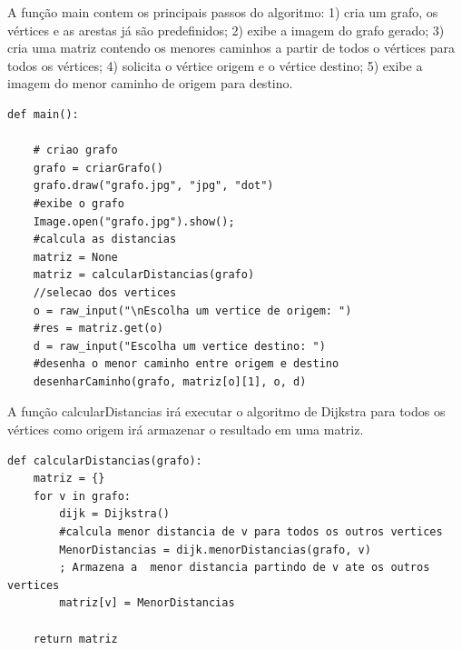 \documentclass[a4paper,12pt]{article}
\begin{document}
A função main contem os principais passos do algoritmo: 1) cria um grafo, os vértices e as arestas já são predefinidos; 2) exibe a imagem do grafo gerado; 3) cria uma matriz contendo os menores caminhos a partir de todos o vértices para todos os vértices; 4) solicita o vértice  origem e o vértice destino; 5) exibe a imagem do menor caminho de origem para destino.
\begin{lstlisting}
def main():

	# criao grafo
	grafo = criarGrafo() 
	grafo.draw("grafo.jpg", "jpg", "dot")
	#exibe o grafo
	Image.open("grafo.jpg").show();
	#calcula as distancias
	matriz = None
	matriz = calcularDistancias(grafo)
	//selecao dos vertices
	o = raw_input("\nEscolha um vertice de origem: ")
	#res = matriz.get(o)
	d = raw_input("Escolha um vertice destino: ")
	#desenha o menor caminho entre origem e destino
	desenharCaminho(grafo, matriz[o][1], o, d)
\end{lstlisting}
A função calcularDistancias irá executar o algoritmo de Dijkstra para todos os vértices como origem irá armazenar o resultado em uma matriz.
\begin{lstlisting}
def calcularDistancias(grafo):
	matriz = {}
	for v in grafo:
		dijk = Dijkstra()
		#calcula menor distancia de v para todos os outros vertices
		MenorDistancias = dijk.menorDistancias(grafo, v)
		; Armazena a  menor distancia partindo de v ate os outros vertices
		matriz[v] = MenorDistancias

	return matriz
\end{lstlisting}
\end{document}
